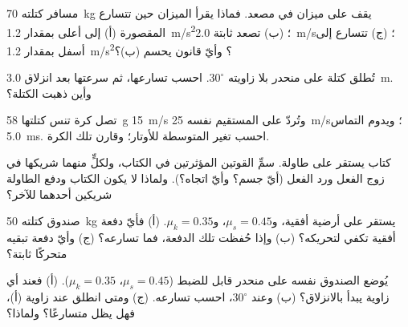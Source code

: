 \begin{exercise}[$\star$]\label{exo:g12:newtons-laws:2}
مسافر كتلته \qty{70}{kg} يقف على ميزان في مصعد. فماذا يقرأ الميزان حين
تتسارع المقصورة (أ) إلى أعلى بمقدار \qty{1.2}{m/s^2}؛ (ب) تصعد  ثابتة
\qty{2.0}{m/s}؛ (ج) تتسارع إلى أسفل بمقدار \qty{1.2}{m/s^2}؟ وأيّ قانون يحسم (ب)؟
\end{exercise}

\begin{exercise}[$\star$]\label{exo:g12:newtons-laws:3}
تُطلق كتلة على منحدر بلا  زاويته $30^\circ$. احسب
تسارعها، ثم سرعتها بعد انزلاق \qty{3.0}{m}. وأين ذهبت الكتلة؟
\end{exercise}

\begin{exercise}[$\star$]\label{exo:g12:newtons-laws:4}
تصل كرة تنس كتلتها \qty{58}{g}  \qty{15}{m/s} وتُردّ على المستقيم
نفسه  \qty{25}{m/s}؛ ويدوم التماس \qty{5.0}{ms}. احسب تغير 
 المتوسطة للأوتار؛ وقارن تلك   الكرة.
\end{exercise}

\begin{exercise}[$\star$]\label{exo:g12:newtons-laws:5}
كتاب يستقر على طاولة. سمِّ القوتين المؤثرتين في الكتاب، ولكلٍّ منهما
شريكها في زوج الفعل ورد الفعل (أيّ جسم؟ وأيّ اتجاه؟). ولماذا لا يكون  الكتاب
ودفع الطاولة شريكين أحدهما للآخر؟
\end{exercise}

\begin{exercise}[$\star\star$]\label{exo:g12:newtons-laws:6}
صندوق كتلته \qty{50}{kg} يستقر على أرضية أفقية، و$\mu_s = 0.45$، و$\mu_k = 0.35$.
(أ) فأيّ دفعة أفقية تكفي لتحريكه؟ (ب) وإذا حُفظت تلك الدفعة، فما
تسارعه؟ (ج) وأيّ دفعة تبقيه متحركًا  ثابتة؟
\end{exercise}

\begin{exercise}[$\star\star$]\label{exo:g12:newtons-laws:7}
يُوضع الصندوق نفسه على منحدر قابل للضبط ($\mu_s = 0.45$، $\mu_k = 0.35$). (أ) فعند
أي زاوية يبدأ بالانزلاق؟ (ب) وعند $30^\circ$، احسب تسارعه.
(ج) ومتى انطلق عند زاوية (أ)، فهل يظل متسارعًا؟ ولماذا؟
\end{exercise}

